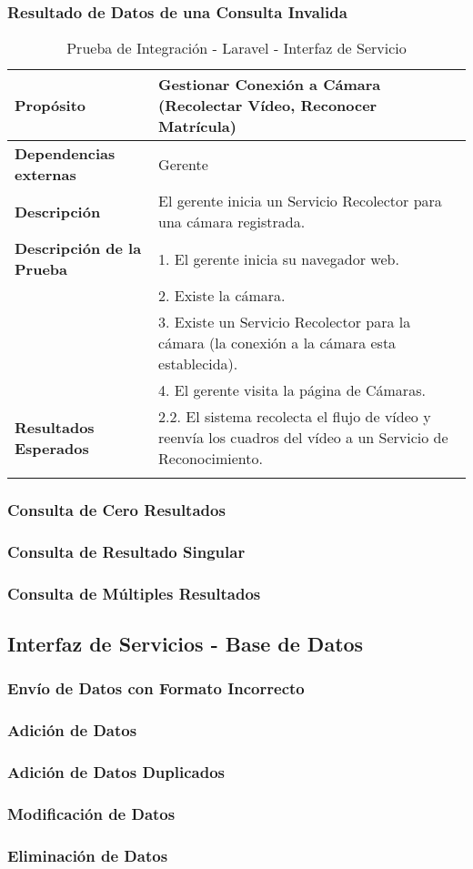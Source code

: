 \subsubsection{Resultado de Datos de una Consulta Invalida}
\begin{longtable}{@{} p{3cm} p{10cm} @{}} \toprule
\textbf{Propósito}                  & Gestionar Conexión a Cámara (Recolectar Vídeo, Reconocer Matrícula) \\ \midrule
\textbf{Dependencias externas}      & Gerente \\ \cmidrule{1-2}
\textbf{Descripción}                & El gerente inicia un Servicio Recolector para una cámara registrada. \\ \cmidrule{1-2}
\textbf{Descripción de la Prueba}   & 1. El gerente inicia su navegador web. \\ 
                                    & 2. Existe la cámara. \\
                                    & 3. Existe un Servicio Recolector para la cámara (la conexión a la cámara esta establecida). \\
                                    & 4. El gerente visita la página de Cámaras.  \\ \cmidrule{1-2} 
\textbf{Resultados Esperados}       & 2.2. El sistema recolecta el flujo de vídeo y reenvía los cuadros del vídeo a un Servicio de Reconocimiento. \\ \bottomrule
\caption{Prueba de Integración - Laravel - Interfaz de Servicio} \label{tab:tabcu-rec}  \\
\end{longtable}
  
 
\pagebreak  
\subsubsection{Consulta de Cero Resultados}
\pagebreak
\subsubsection{Consulta de Resultado Singular}
\pagebreak
\subsubsection{Consulta de Múltiples Resultados}
\pagebreak
\subsection{Interfaz de Servicios - Base de Datos}
\subsubsection{Envío de Datos con Formato Incorrecto}
\pagebreak
\subsubsection{Adición de Datos}
\pagebreak
\subsubsection{Adición de Datos Duplicados}
\pagebreak
\subsubsection{Modificación de Datos}
\pagebreak
\subsubsection{Eliminación de Datos}
